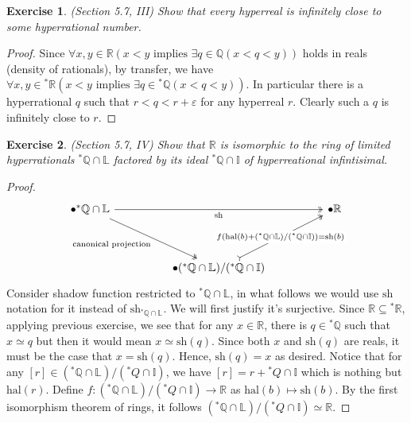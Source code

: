 \documentclass[a4paper, 11pt]{book}
\theoremstyle{plain}
\newtheorem{exercise}{Exercise}[chapter]
\theoremstyle{plain}
\newcommand{\Q}{\mathbb{Q}}
\newcommand{\R}{\mathbb{R}}
\newcommand{\I}{\mathbb{I}}
\newcommand{\ep}{\varepsilon}
\newcommand{\hyp}{{}^*}
\newcommand{\hal}{\text{hal}}
\newcommand{\sh}{\text{sh}}
\begin{document}
  \begin{exercise}
    (Section 5.7, III)
    Show that every hyperreal is infinitely close to some hyperrational number.
  \end{exercise}
  \begin{proof}
    Since $\forall x,y \in \R (x<y \text{ implies } \exists q \in \Q (x<q<y))$ holds in reals (density of rationals), by transfer, we have $\forall x,y \in \hyp \R (x<y \text{ implies } \exists q \in \hyp \Q (x<q<y))$. In particular there is a hyperrational $q$ such that $r<q<r+\ep$ for any hyperreal $r$. Clearly such a $q$ is infinitely close to $r$.
  \end{proof}

  \begin{exercise}
    (Section 5.7, IV)
    Show that $\R$ is isomorphic to the ring of limited hyperrationals $\hyp \Q \cap \mathbb{L}$ factored by its ideal $\hyp \Q \cap \I$ of hyperreational infintisimal.
  \end{exercise}
  \begin{proof}
    \[\begin{tikzcd}
      {\bullet {}^*\mathbb{Q} \cap \mathbb{L}} &&&& {\bullet \mathbb{R}} \\
      \\
      && {\bullet ({}^* \mathbb{Q} \cap \mathbb{L})/({}^* \mathbb{Q} \cap \mathbb{I})}
      \arrow["{\text{canonical projection}}"', two heads, from=1-1, to=3-3]
      \arrow["{f(\text{hal}(b)+({}^* \mathbb{Q} \cap \mathbb{L})/({}^* \mathbb{Q} \cap \mathbb{I}))=\text{sh}(b)}"{description}, tail, two heads, from=3-3, to=1-5]
      \arrow["{\text{sh}}"', two heads, from=1-1, to=1-5]
    \end{tikzcd}\]
    Consider shadow function restricted to $\hyp \Q \cap \mathbb{L}$, in what follows we would use $\sh$ notation for it instead of $\sh_{\hyp \Q \cap \mathbb{L}}$. We will first justify it's surjective. Since $\R \subseteq \hyp \R$, applying previous exercise, we see that for any $x \in \R$, there is $q \in \hyp \Q$ such that $x \simeq q$ but then it would mean $x \simeq \sh(q)$. Since both $x$ and $\sh(q)$ are reals, it must be the case that $x=\sh(q)$. Hence, $\sh(q)=x$ as desired. Notice that for any $[r] \in (\hyp \Q \cap \mathbb{L})/(\hyp Q \cap \I)$, we have $[r]=r+\hyp Q \cap \I$ which is nothing but $\hal(r)$. Define $f: (\hyp \Q \cap \mathbb{L})/(\hyp Q \cap \I) \rightarrow \R$ as $\hal(b) \mapsto \sh(b)$. By the first isomorphism theorem of rings, it follows $(\hyp \Q \cap \mathbb{L})/(\hyp Q \cap \I) \simeq \R$.
  \end{proof}
\end{document}
